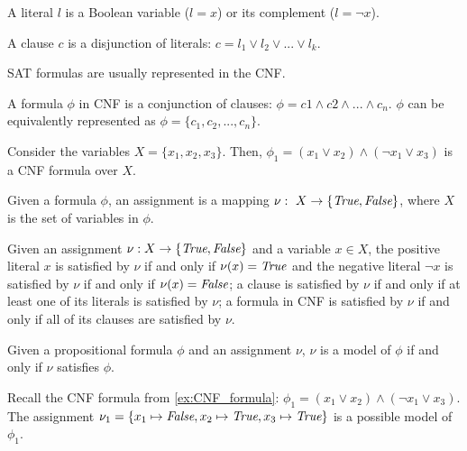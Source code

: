 \begin{definition}[Literal]
A literal \(l\) is a Boolean variable (\(l = x\)) or its complement (\(l = \neg x\)).
\end{definition}

\begin{definition}[Clause]
A clause \(c\) is a disjunction of literals: \(c = l_1 \lor l_2 \lor ... \lor l_k\).
\end{definition}

\noindent
\ac{SAT} formulas are usually represented in the \acf{CNF}. 

\begin{definition}
A formula \(\phi\) in \ac{CNF} is a conjunction of clauses: \(\phi = c1 \land c2 \land ... \land c_n\). \(\phi\) can be equivalently represented as \(\phi = \{c_1, c_2, ..., c_n\}\).
\end{definition}

\begin{example}\label{ex:CNF_formula}
Consider the variables \(X = \{x_1, x_2, x_3\}\). Then, \(\phi_1 = (x_1 \lor x_2) \land (\neg x_1 \lor x_3)\) is a \ac{CNF} formula over \(X\).
\end{example}

\begin{definition}[Assignment]
Given a formula \(\phi\), an assignment is a mapping \(\nu:~X\rightarrow\{\textit{True},\textit{False}\}\), where \(X\) is the set of variables in \(\phi\).
\end{definition}

\noindent
Given an assignment \(\nu : X \rightarrow \{\textit{True}, \textit{False}\}\) and a variable \(x \in X\), the positive literal \(x\) is satisfied by \(\nu\) if and only if \(\nu(x) = \textit{True}\) and the negative literal \(\neg x\) is satisfied by \(\nu\) if and only if \(\nu(x) = \textit{False}\); a clause is satisfied by \(\nu\) if and only if at least one of its literals is satisfied by \(\nu\); a formula in CNF is satisfied by \(\nu\) if and only if all of its clauses are satisfied by \(\nu\).

\begin{definition}[Model]
Given a propositional formula  \(\phi\) and an assignment \(\nu\), \(\nu\) is a model of \(\phi\) if and only if \(\nu\) satisfies \(\phi\).
\end{definition}

\begin{example}
Recall the \ac{CNF} formula from \autoref{ex:CNF_formula}: \(\phi_1 = (x_1 \lor x_2) \land (\neg x_1 \lor x_3)\). The assignment \(\nu_1 = \{x_1 \mapsto \textit{False}, x_2 \mapsto \textit{True}, x_3 \mapsto \textit{True}\}\) is a possible model of \(\phi_1\).
\end{example}

